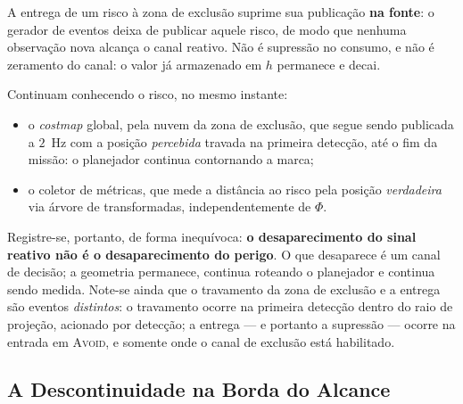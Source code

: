 A entrega de um risco à zona de exclusão suprime sua publicação \textbf{na fonte}: o
gerador de eventos deixa de publicar aquele risco, de modo que nenhuma observação nova
alcança o canal reativo. Não é supressão no consumo, e não é zeramento do canal: o
valor já armazenado em $h$ permanece e decai.

Continuam conhecendo o risco, no mesmo instante:

\begin{itemize}
    \item o \textit{costmap} global, pela nuvem da zona de exclusão, que segue sendo
    publicada a $2$~Hz com a posição \emph{percebida} travada na primeira detecção, até
    o fim da missão: o planejador continua contornando a marca;
    \item o coletor de métricas, que mede a distância ao risco pela posição
    \emph{verdadeira} via árvore de transformadas, independentemente de $\Phi$.
\end{itemize}

Registre-se, portanto, de forma inequívoca: \textbf{o desaparecimento do sinal reativo
não é o desaparecimento do perigo}. O que desaparece é um canal de decisão; a geometria
permanece, continua roteando o planejador e continua sendo medida. Note-se ainda que o
travamento da zona de exclusão e a entrega são eventos \emph{distintos}: o travamento
ocorre na primeira detecção dentro do raio de projeção, acionado por detecção; a entrega
--- e portanto a supressão --- ocorre na entrada em \textsc{Avoid}, e somente onde o
canal de exclusão está habilitado.

\subsection{A Descontinuidade na Borda do Alcance}

